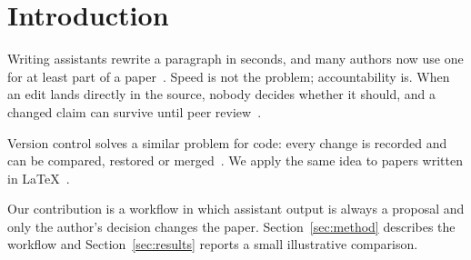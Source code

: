\section{Introduction}
\label{sec:introduction}

Writing assistants rewrite a paragraph in seconds, and many authors now use one for at least part of a paper~\cite{park2022review}.
Speed is not the problem; accountability is.
When an edit lands directly in the source, nobody decides whether it should, and a changed claim can survive until peer review~\cite{lee2024tracking}.

Version control solves a similar problem for code: every change is recorded and can be compared, restored or merged~\cite{myers1986diff}.
We apply the same idea to papers written in \LaTeX{}~\cite{lamport1994latex}.

Our contribution is a workflow in which assistant output is always a proposal and only the author's decision changes the paper.
Section~\ref{sec:method} describes the workflow and Section~\ref{sec:results} reports a small illustrative comparison.
